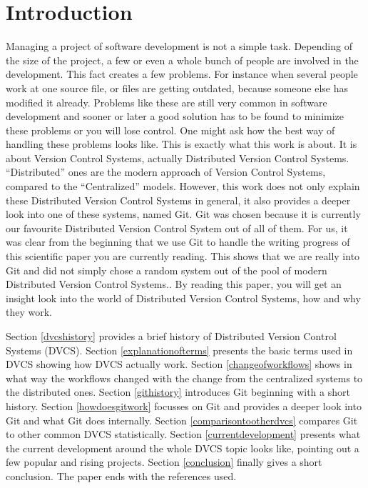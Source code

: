 \section {Introduction}

Managing a project of software development is not a simple task. Depending of the size of the project, a few or even a whole bunch of people are involved in the development. This fact creates a few problems. For instance when several people work at one source file, or files are getting outdated, because someone else has modified it already. Problems like these are still very common in software development and sooner or later a good solution has to be found to minimize these problems or you will lose control. One might ask how the best way of handling these problems looks like.
This is exactly what this work is about. It is about Version Control Systems, actually Distributed Version Control Systems. "`Distributed"' ones are the modern approach of Version Control Systems, compared to the "`Centralized"' models. However, this work does not only explain these Distributed Version Control Systems in general, it also provides a deeper look into one of these systems, named Git.
Git was chosen because it is currently our favourite Distributed Version Control System out of all of them. For us, it was clear from the beginning that we use Git to handle the writing progress of this scientific paper you are currently reading. This shows that we are really into Git and did not simply chose a random system out of the pool of modern Distributed Version Control Systems..
By reading this paper, you will get an insight look into the world of Distributed Version Control Systems, how and why they work.

Section \ref{dvcshistory} provides a brief history of Distributed Version Control Systems (DVCS). Section \ref{explanationofterms} presents the basic terms used in DVCS showing how DVCS actually work. Section \ref{changeofworkflows} shows in what way the workflows changed with the change from the centralized systems to the distributed ones. Section \ref{githistory} introduces Git beginning with a short history. Section \ref{howdoesgitwork} focusses on Git and provides a deeper look into Git and what Git does internally. Section \ref{comparisontootherdvcs} compares Git to other common DVCS statistically. Section \ref{currentdevelopment} presents what the current development around the whole DVCS topic looks like, pointing out a few popular and rising projects. Section \ref{conclusion} finally gives a short conclusion. The paper ends with the references used. 